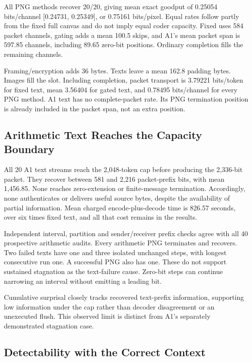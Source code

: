 All PNG methods recover 20/20, giving mean exact goodput of 0.25054 bits/channel [0.24731, 0.25349], or 0.75161 bits/pixel. Equal rates follow partly from the fixed full canvas and do not imply equal coder capacity. Fixed uses 584 packet channels, gating adds a mean 100.5 skips, and A1's mean packet span is 597.85 channels, including 89.65 zero-bit positions. Ordinary completion fills the remaining channels.

Framing/encryption adds 36 bytes. Texts leave a mean 162.8 padding bytes. Images fill the slot. Including completion, packet transport is 3.79221 bits/token for fixed text, mean 3.56404 for gated text, and 0.78495 bits/channel for every PNG method. A1 text has no complete-packet rate. Its PNG termination position is already included in the packet span, not an extra position.

\subsection{Arithmetic Text Reaches the Capacity Boundary}
All 20 A1 text streams reach the 2,048-token cap before producing the 2,336-bit packet. They recover between 581 and 2,216 packet-prefix bits, with mean 1,456.85. None reaches zero-extension or finite-message termination. Accordingly, none authenticates or delivers useful source bytes, despite the availability of partial information. Mean charged encode-plus-decode time is 826.57 seconds, over six times fixed text, and all that cost remains in the results.

Independent interval, partition and sender/receiver prefix checks agree with all 40 prospective arithmetic audits. Every arithmetic PNG terminates and recovers. Two failed texts have one and three isolated unchanged steps, with longest consecutive run one. A successful PNG also has one. These do not support sustained stagnation as the text-failure cause. Zero-bit steps can continue narrowing an interval without emitting a leading bit.

Cumulative surprisal closely tracks recovered text-prefix information, supporting low information under the cap rather than decoder disagreement or an unexecuted flush. This observed limit is distinct from A1's separately demonstrated stagnation case.

\subsection{Detectability with the Correct Context}
\label{sec:detection-results}


